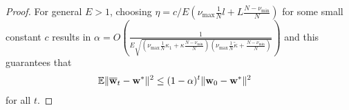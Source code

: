 \begin{proof}
	For general $E>1$, choosing $\eta=c/E(\nu_{\max}\frac{1}{N}l+L\frac{N-\nu_{\min}}{N})$
	for some small constant $c$ results in $\alpha=O(\frac{1}{E\sqrt{(\nu_{\max}\frac{1}{N}\kappa_{1}+\kappa\frac{N-\nu_{\min}}{N})(\nu_{\max}\frac{1}{N}\tilde{\kappa}+\frac{N-\nu_{\min}}{N})}})$
	and this guarantees that 
	\begin{align*}
	\mathbb{E}\|{\overline{\mathbf{w}}}_{t}-{\mathbf{w}}^{\ast}\|^{2} & \leq(1-\alpha)^{t}\|{\mathbf{w}}_{0}-{\mathbf{w}}^{\ast}\|^{2}
	\end{align*}
	for all $t$. 
	
	
\end{proof}